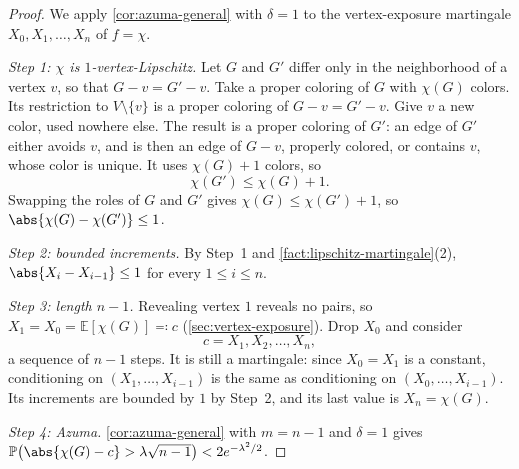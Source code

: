 \begin{proof}
    We apply \autoref{cor:azuma-general} with \(\delta = 1\) to the vertex-exposure martingale \(X_{0}, X_{1}, \ldots, X_{n}\) of \(f = \chi\).

    \emph{Step 1: \(\chi\) is \(1\)-vertex-Lipschitz.} Let \(G\) and \(G'\) differ only in the neighborhood of a vertex \(v\), so that \(G - v = G' - v\). Take a proper coloring of \(G\) with \(\chi(G)\) colors. Its restriction to \(V \setminus \{v\}\) is a proper coloring of \(G - v = G' - v\). Give \(v\) a new color, used nowhere else. The result is a proper coloring of \(G'\): an edge of \(G'\) either avoids \(v\), and is then an edge of \(G - v\), properly colored, or contains \(v\), whose color is unique. It uses \(\chi(G) + 1\) colors, so
    \[
        \chi(G') \le \chi(G) + 1 .
    \]
    Swapping the roles of \(G\) and \(G'\) gives \(\chi(G) \le \chi(G') + 1\), so \(\abs{\chi(G) - \chi(G')} \le 1\).

    \emph{Step 2: bounded increments.} By Step~1 and \autoref{fact:lipschitz-martingale}(2), \(\abs{X_{i} - X_{i-1}} \le 1\) for every \(1 \le i \le n\).

    \emph{Step 3: length \(n-1\).} Revealing vertex \(1\) reveals no pairs, so \(X_{1} = X_{0} = \mathbb{E}[\chi(G)] \eqqcolon c\) (\autoref{sec:vertex-exposure}). Drop \(X_{0}\) and consider
    \[
        c = X_{1}, X_{2}, \ldots, X_{n} ,
    \]
    a sequence of \(n - 1\) steps. It is still a martingale: since \(X_{0} = X_{1}\) is a constant, conditioning on \((X_{1}, \ldots, X_{i-1})\) is the same as conditioning on \((X_{0}, \ldots, X_{i-1})\). Its increments are bounded by \(1\) by Step~2, and its last value is \(X_{n} = \chi(G)\).

    \emph{Step 4: Azuma.} \autoref{cor:azuma-general} with \(m = n - 1\) and \(\delta = 1\) gives \(\mathbb{P}\bigl( \abs{\chi(G) - c} > \lambda \sqrt{n-1} \bigr) < 2 e^{-\lambda^{2}/2}\).
\end{proof}

